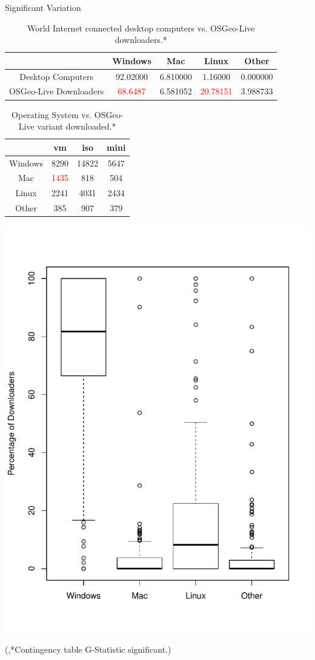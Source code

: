 \documentclass{beamer}
\newenvironment{reference}[2]{%
  \begin{textblock*}{\textwidth}(#1,#2) 
      \footnotesize\it\bgroup\color{black}}{\egroup\end{textblock*}}
\begin{document}
\begin{frame}{Significant Variation}
\centering
\begin{tiny}
\vspace{-.1in}
\begin{table}
\caption{\tiny World Internet connected desktop computers vs. OSGeo-Live downloaders.*}
\vspace{-.1in}
	\begin{tabular}{c | c c c c }
 		& Windows & Mac & Linux & Other \\ \hline
		Desktop Computers & 92.02000 & 6.810000 & 1.16000 & 0.000000 \\ 
		OSGeo-Live Downloaders & \textcolor{red}{68.6487} & 6.581052 & \textcolor{red}{20.78151} & 3.988733
	\end{tabular}
\end{table}
\vspace{-.2in}
\begin{table}
\caption{\tiny Operating System vs. OSGeo-Live variant downloaded.*}
\vspace{-.1in}
	\begin{tabular}{c | c c c }
		& vm & iso & mini	\\	\hline
		Windows& 8290 & 14822 & 5647 \\
		Mac& \textcolor{red}{1435} & 818 & 504 \\
		Linux& 2241 & 4031 & 2434 \\
		Other& 385 & 907 & 379 \\
	\end{tabular}
\end{table}

\end{tiny}
\vspace{-.3in}

\begin{center}
\includegraphics[width=.4\textwidth]{CountryOSVariation.pdf}
\end{center}
\vspace{-.1in}

\begin{reference}{11mm}{93mm}
\tiny{*Contingency table G-Statistic significant.}
\end{reference}

\end{frame}
\end{document}
